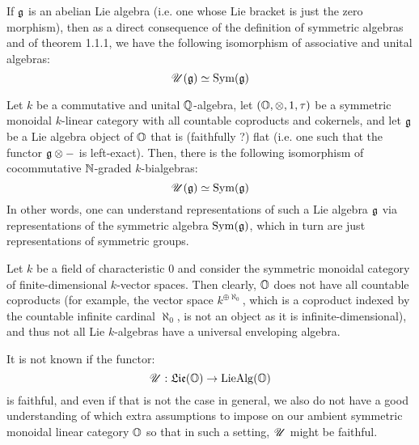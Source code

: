             \begin{example}
                If $\mathfrak{g}$ is an abelian Lie algebra (i.e. one whose Lie bracket is just the zero morphism), then as a direct consequence of the definition of symmetric algebras and of theorem 1.1.1, we have the following isomorphism of associative and unital algebras:
                    $$\mathscr{U}(\mathfrak{g}) \simeq \mathrm{Sym}(\mathfrak{g})$$
            \end{example}
            \begin{example}
                Let $k$ be a commutative and unital $\mathbb{Q}$-algebra, let $(\O, \tensor, 1, \tau)$ be a symmetric monoidal $k$-linear category with all countable coproducts and cokernels, and let $\mathfrak{g}$ be a Lie algebra object of $\mathbb{O}$ that is (faithfully ?) flat (i.e. one such that the functor $\g \tensor -$ is left-exact). Then, there is the following isomorphism of cocommutative $\mathbb{N}$-graded $k$-bialgebras:
                    $$\mathscr{U}(\mathfrak{g}) \simeq \mathrm{Sym}(\mathfrak{g})$$
                In other words, one can understand representations of such a Lie algebra $\mathfrak{g}$ via representations of the symmetric algebra $\mathrm{Sym}(\mathfrak{g})$, which in turn are just representations of symmetric groups.
            \end{example}
            \begin{example}
                Let $k$ be a field of characteristic $0$ and consider the symmetric monoidal category of finite-dimensional $k$-vector spaces. Then clearly, $\mathbb{O}$ does not have all countable coproducts (for example, the vector space $k^{\oplus \aleph_0}$, which is a coproduct indexed by the countable infinite cardinal $\aleph_0$, is not an object as it is infinite-dimensional), and thus not all Lie $k$-algebras have a universal enveloping algebra.
            \end{example}
            \begin{example}
                It is not known if the functor:
                    $$\mathscr{U}: \mathfrak{Lie}(\mathbb{O}) \to \mathrm{Lie}\mathrm{Alg}(\mathbb{O})$$
                is faithful, and even if that is not the case in general, we also do not have a good understanding of which extra assumptions to impose on our ambient symmetric monoidal linear category $\mathbb{O}$ so that in such a setting, $\mathscr{U}$ might be faithful. 
            \end{example}
            
